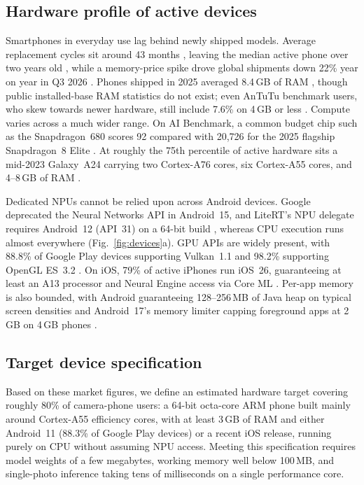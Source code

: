 \documentclass[conference]{IEEEtran}
\begin{document}
\subsection{Hardware profile of active devices}
Smartphones in everyday use lag behind newly shipped models. Average replacement
cycles sit around 43 months \cite{counterpoint2025replacement}, leaving the
median active phone over two years old \cite{russell2025inequality}, while a
memory-price spike drove global shipments down 22\% year on year in Q3 2026
\cite{idc2026q3}. Phones shipped in 2025 averaged 8.4\,GB of RAM
\cite{counterpoint2026dram}, though public installed-base RAM statistics do not
exist; even AnTuTu benchmark users, who skew towards newer hardware, still
include 7.6\% on 4\,GB or less \cite{antutu2026ram}. Compute varies across a
much wider range. On AI Benchmark, a common budget chip such as the
Snapdragon~680 scores 92 compared with 20,726 for the 2025 flagship
Snapdragon~8 Elite \cite{aibenchmark2026ranking}. At roughly the 75th
percentile of active hardware sits a mid-2023 Galaxy~A24 carrying two
Cortex-A76 cores, six Cortex-A55 cores, and 4--8\,GB of RAM
\cite{russell2025inequality}.

Dedicated NPUs cannot be relied upon across Android devices. Google deprecated
the Neural Networks API in Android~15, and LiteRT's NPU delegate requires
Android~12 (API~31) on a 64-bit build \cite{litert2026}, whereas CPU execution
runs almost everywhere (Fig.~\ref{fig:devices}a). GPU APIs are widely present,
with 88.8\% of Google Play devices supporting Vulkan~1.1 and 98.2\% supporting
OpenGL ES~3.2 \cite{android2025dashboard}. On iOS, 79\% of active iPhones run
iOS~26, guaranteeing at least an A13 processor and Neural Engine access via
Core ML \cite{apple2026adoption}. Per-app memory is also bounded, with Android
guaranteeing 128--256\,MB of Java heap on typical screen densities
\cite{android16cdd} and Android~17's memory limiter capping foreground apps at
2\,GB on 4\,GB phones \cite{android2026memorylimiter}.

\subsection{Target device specification}
Based on these market figures, we define an estimated hardware target covering
roughly 80\% of camera-phone users: a 64-bit octa-core ARM phone built mainly
around Cortex-A55 efficiency cores, with at least 3\,GB of RAM and either
Android~11 (88.3\% of Google Play devices) or a recent iOS release, running
purely on CPU without assuming NPU access. Meeting this specification requires
model weights of a few megabytes, working memory well below 100\,MB, and
single-photo inference taking tens of milliseconds on a single performance core.
\end{document}
